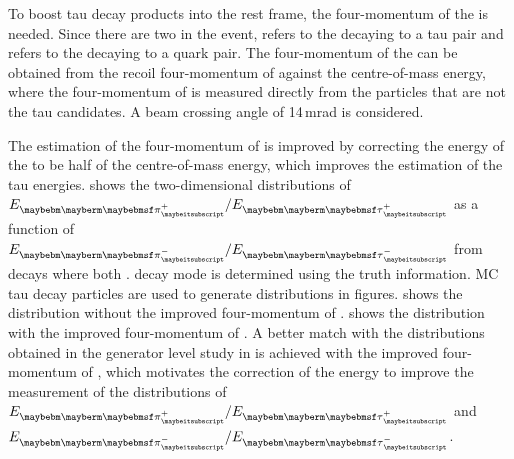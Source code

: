 To boost  tau decay products into the \PZ rest frame, the four-momentum of the \PZ is needed. Since there are two \PZ in the \eeZZQQ event, \ZForTauTau refers to the \PZ decaying to a tau pair and \ZForqq refers to the \PZ decaying to a quark pair. The four-momentum of the \ZForTauTau can be obtained from the recoil four-momentum of \ZForqq against the centre-of-mass energy, where the four-momentum of \ZForqq is measured directly from the particles that are not the tau candidates. A beam crossing angle of  14\,mrad is considered.


The estimation of the four-momentum of   \ZForTauTau is improved by correcting the energy of the \ZForTauTau to be half of the centre-of-mass energy, which improves the estimation of the tau energies.  shows the two-dimensional distributions of $E_{\Ppiplus}/E_{\APtauon}$ as a function of $E_{\Ppiminus}/E_{\Ptauon}$ from \ZToTauTau decays where both \tauToPionBoth. \tauToPionBoth decay mode is determined using the truth information. MC tau decay particles are used to generate distributions in figures.  shows the distribution without the  improved four-momentum of   \ZForTauTau.  shows the distribution with the  improved four-momentum of   \ZForTauTau. A better match with the distributions obtained in the generator level study in  is achieved with the   improved four-momentum of   \ZForTauTau, which motivates the correction of the \ZForTauTau energy to improve the measurement of the distributions of $E_{\Ppiplus} / E_{\APtauon}$ and $E_{\Ppiminus} / E_{\Ptauon}$.


